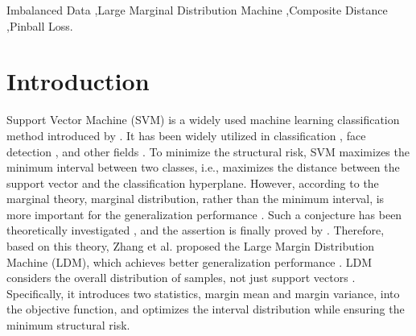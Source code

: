 \documentclass[a4paper]{cas-sc}
\begin{document}
\begin{keywords}
Imbalanced Data \sep Large Marginal Distribution Machine \sep Composite Distance \sep Pinball Loss.
\end{keywords}

\maketitle

\section{Introduction}
Support Vector Machine (SVM) is a widely used machine learning classification method introduced by \cite{cortes1995support}. {\color{blue} It has been widely utilized in classification \citep{rezvani2021class,chen2025ams,naveen2025effnet,rezvani2022intuitionistic,YU2023105751}, face detection \citep{tiwari2024comprehensive,rashad2024ccnn}, and other fields \citep{huang2021railway,yang2022novel,POURHOSSEINI2023106780,LYAQINI2024107567}.} To minimize the structural risk, SVM maximizes the minimum interval between two classes, i.e., maximizes the distance between the support vector and the classification hyperplane. However, according to the marginal theory, marginal distribution, rather than the minimum interval, is more important for the generalization performance \citep{reyzin2006boosting}. Such a conjecture has been theoretically investigated \citep{wang2011refined,gao2013doubt}, and the assertion is finally proved by \cite{gao2013doubt}. Therefore, based on this theory, Zhang et al. proposed the Large Margin Distribution Machine (LDM), which achieves better generalization performance \citep{zhang2014large}. LDM considers the overall distribution of samples, not just support vectors \citep{huang2016solution,zhang2023novel}. Specifically, it introduces two statistics, margin mean and margin variance, into the objective function, and optimizes the interval distribution while ensuring the minimum structural risk. 
\end{document}
